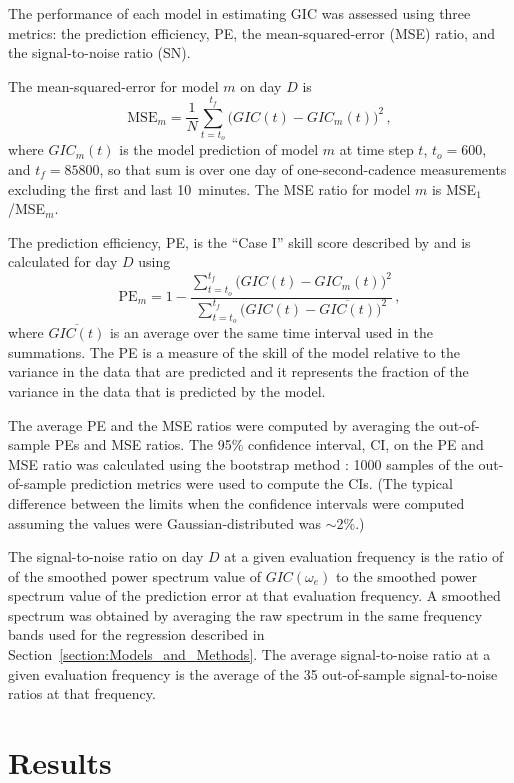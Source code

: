\documentclass[draft,linenumbers]{agujournal2018}
\begin{document}
The performance of each model in estimating GIC was assessed using three metrics: the prediction efficiency, PE, the mean-squared-error (MSE) ratio, and the signal-to-noise ratio (SN).

The mean-squared-error for model $m$ on day $D$ is
\begin{equation*}
  \mbox{MSE}_m = \frac{1}{N}\sum_{t=t_o}^{t_f} \big(GIC(t)-GIC_m(t)\big)^2 \,,
\end{equation*}
\noindent
where $GIC_m(t)$ is the model prediction of model $m$ at time step $t$, $t_o=600$, and $t_f=85800$, so that sum is over one day of one-second-cadence measurements excluding the first and last 10~minutes. The MSE ratio for model $m$ is MSE$_1$/MSE$_m$.

The prediction efficiency, PE, is the ``Case I'' skill score described by \cite{Murphy1988} and is calculated for day $D$ using
\begin{equation*}
  \mbox{PE}_m = 1 - \frac{\sum_{t=t_o}^{t_f} \big(GIC(t)-GIC_m(t)\big)^2}{\sum_{t=t_o}^{t_f} \big(GIC(t)-\overline{GIC(t)}\big)^2}\,,
\end{equation*}
\noindent
where $\overline{GIC(t)}$ is an average over the same time interval used in the summations. The PE is a measure of the skill of the model relative to the variance in the data that are predicted and it represents the fraction of the variance in the data that is predicted by the model.

The average PE and the MSE ratios were computed by averaging the out-of-sample PEs and MSE ratios. The 95\% confidence interval, CI, on the PE and MSE ratio was calculated using the bootstrap method \citep{Zoubir1998}: 1000 samples of the out-of-sample prediction metrics were used to compute the CIs. (The typical difference between the limits when the confidence intervals were computed assuming the values were Gaussian-distributed was $\sim$2\%.)

The signal-to-noise ratio on day $D$ at a given evaluation frequency is the ratio of of the smoothed power spectrum value of $GIC(\omega_e)$ to the smoothed power spectrum value of the prediction error at that evaluation frequency. A smoothed spectrum was obtained by averaging the raw spectrum in the same frequency bands used for the regression described in Section~\ref{section:Models_and_Methods}. The average signal-to-noise ratio at a given evaluation frequency is the average of the 35 out-of-sample signal-to-noise ratios at that frequency.

\section{Results}
\label{results}
\end{document}
